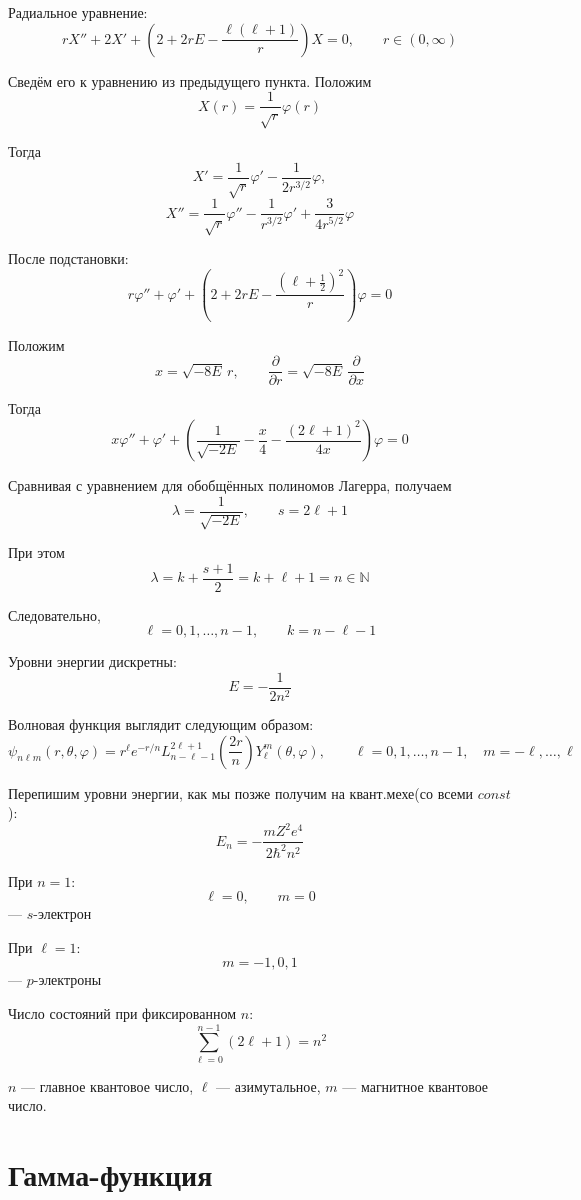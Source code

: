 \documentclass[11pt,a4paper]{report}
\numberwithin{equation}{section}
\numberwithin{figure}{chapter}
\numberwithin{table}{chapter}
\newcommand{\N}{\mathbb{N}}
\begin{document}
Радиальное уравнение:
\[
rX''
+
2X'
+
\left(
2+2rE-\frac{\ell(\ell+1)}{r}
\right)X
=
0,
\qquad
r\in(0,\infty)
\]

Сведём его к уравнению из предыдущего пункта. Положим
\[
X(r)
=
\frac{1}{\sqrt r}\varphi(r)
\]

Тогда
\[
X'
=
\frac{1}{\sqrt r}\varphi'
-
\frac{1}{2r^{3/2}}\varphi,
\]
\[
X''
=
\frac{1}{\sqrt r}\varphi''
-
\frac{1}{r^{3/2}}\varphi'
+
\frac{3}{4r^{5/2}}\varphi
\]

После подстановки:
\[
r\varphi''
+
\varphi'
+
\left(
2+2rE
-
\frac{(\ell+\frac12)^2}{r}
\right)\varphi
=
0
\]

Положим
\[
x=\sqrt{-8E}\,r,
\qquad
\frac{\partial}{\partial r}
=
\sqrt{-8E}\,
\frac{\partial}{\partial x}
\]

Тогда
\[
x\varphi''
+
\varphi'
+
\left(
\frac{1}{\sqrt{-2E}}
-\frac{x}{4}
-
\frac{(2\ell+1)^2}{4x}
\right)\varphi
=
0
\]

Сравнивая с уравнением для обобщённых полиномов Лагерра, получаем
\[
\lambda=\frac{1}{\sqrt{-2E}},
\qquad
s=2\ell+1
\]

При этом
\[
\lambda=k+\frac{s+1}{2}
=
k+\ell+1
=
n\in\N
\]

Следовательно,
\[
\ell=0,1,\ldots,n-1,
\qquad
k=n-\ell-1
\]

Уровни энергии дискретны:
\[
E=-\frac{1}{2n^2}
\]

Волновая функция выглядит следующим образом:
\[
\psi_{n\ell m}(r,\theta,\varphi)
=
r^\ell e^{-r/n}
L_{n-\ell-1}^{2\ell+1}
\left(\frac{2r}{n}\right)
Y_\ell^m(\theta,\varphi),\qquad
\ell=0,1,\ldots,n-1,
\quad
m=-\ell,\ldots,\ell
\]

Перепишим уровни энергии, как мы позже получим на квант.мехе(со всеми $const$):
\[
E_n
=
-\frac{mZ^2e^4}{2\hbar^2n^2}
\]

При $n=1$:
\[
\ell=0,\qquad m=0
\]
--- $s$-электрон

При $\ell=1$:
\[
m=-1,0,1
\]
--- $p$-электроны

Число состояний при фиксированном $n$:
\[
\sum_{\ell=0}^{n-1}(2\ell+1)=n^2
\]

$n$ --- главное квантовое число, $\ell$ --- азимутальное, $m$ --- магнитное квантовое число.



\section{Гамма-функция}
\end{document}
